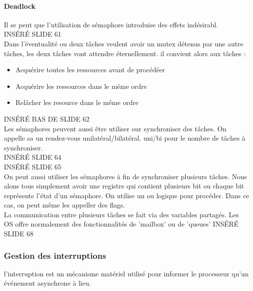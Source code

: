 \documentclass[oneside]{book}
\begin{document}
    \paragraph{Deadlock} Il se peut que l'utilisation de sémaphore introduise des effets indésirabl.\\
    
    INSÉRÉ SLIDE 61\\
    
    Dans l'éventualité ou deux tâches veulent avoir un mutex détenus par une autre tâches, les deux tâches vont attendre éternellement. il convient alors aux tâches :
    
    \begin{itemize}
        \item Acquérire toutes les ressources avant de procédéer
        \item Acquérire les ressources dans le même ordre
        \item Relâcher les resource dans le même ordre
    \end{itemize}

    INSÉRÉ BAS DE SLIDE 62\\
    
    Les sémaphores peuvent aussi être utiliser our synchroniser des tâches. On appelle sa un rendez-vous unilatéral/bilatéral. uni/bi pour le nombre de tâches à synchroniser.\\
    
    INSÉRÉ SLIDE 64\\
    
    INSÉRÉ SLIDE 65\\
    
    On peut aussi utiliser les sémaphores à fin de synchroniser plusieurs tâches. Nous alons tous simplement avoir une registre qui contient plusieurs bit ou chaque bit représente l'état d'un sémaphore. On utilise un ou logique pour procéder. Dans ce cas, on peut même les appeller des flags.\\
    
    La communication entre plusieurs tâches se fait via des variables partagés. Les OS offre normalement des fonctionnalités de 'mailbox' ou de 'queues' INSÉRÉ SLIDE 68\\
    
    \subsubsection{Gestion des interruptions}
    l'interruption est un mécanisme matériel utilisé pour informer le processeur qu'un événement asynchrone à lieu.\\
    
\end{document}
